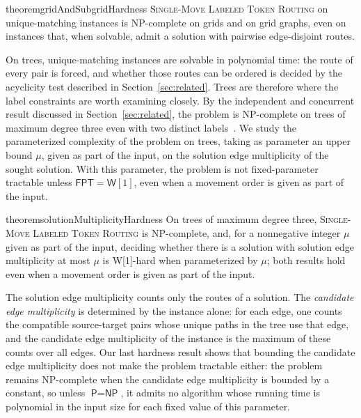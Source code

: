 \documentclass[a4paper,USenglish,thm-restate]{lipics-v2021}
\theoremstyle{problemstyle}
\begin{document}
\begin{restatable}{theorem}{gridAndSubgridHardness}
\label{thm:grid_and_subgrid_hardness}
\textsc{Single-Move Labeled Token Routing} on unique-matching instances is
\textsf{NP}-complete on grids and on grid graphs, even on instances that,
when solvable, admit a solution with pairwise edge-disjoint routes.
\end{restatable}

On trees, unique-matching instances are solvable in polynomial time: the
route of every pair is forced, and whether those routes can be ordered is
decided by the acyclicity test described in Section~\ref{sec:related}. Trees are therefore where
the label constraints are worth examining closely. By the independent and
concurrent result discussed in Section~\ref{sec:related}, the problem is
\textsf{NP}-complete on trees of maximum degree three even with two
distinct labels~\cite{Geft2026Trees}. We study the parameterized complexity
of the problem on trees, taking as parameter an upper bound $\mu$, given as
part of the input, on the solution edge multiplicity of the sought solution.
With this parameter, the problem is not fixed-parameter tractable unless
$\textsf{FPT}=\textsf{W}[1]$, even when a movement order is given as part of
the input.

\begin{restatable}{theorem}{solutionMultiplicityHardness}
\label{thm:sol_multiplicity_hardness}
On trees of maximum degree three, \textsc{Single-Move Labeled Token Routing}
is \textsf{NP}-complete, and, for a nonnegative integer $\mu$ given as part
of the input, deciding whether there is a solution with solution edge
multiplicity at most $\mu$ is \textsf{W}[1]-hard when parameterized by
$\mu$; both results hold even when a movement order is given as part of
the input.
\end{restatable}

The solution edge multiplicity counts only the routes of a solution.
The \emph{candidate edge multiplicity} is determined by the instance alone:
for each edge, one counts the compatible source-target pairs whose unique
paths in the tree use that edge, and the candidate edge multiplicity of the
instance is the maximum of these counts over all edges. Our last hardness
result shows that bounding the candidate edge multiplicity does not make the
problem tractable either: the problem remains \textsf{NP}-complete when the
candidate edge multiplicity is bounded by a constant, so unless
$\textsf{P}=\textsf{NP}$, it admits no algorithm whose running time is
polynomial in the input size for each fixed value of this parameter.
\end{document}
